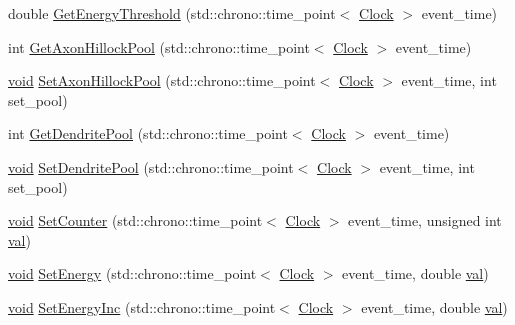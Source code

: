 \begin{DoxyCompactItemize}
\item 
double \mbox{\hyperlink{class_soma_a0b45cc454565027bb25daa1396056a7e}{Get\+Energy\+Threshold}} (std\+::chrono\+::time\+\_\+point$<$ \mbox{\hyperlink{universe_8h_a0ef8d951d1ca5ab3cfaf7ab4c7a6fd80}{Clock}} $>$ event\+\_\+time)
\item 
int \mbox{\hyperlink{class_soma_a23dc309849522d9f857fdcc71ea85877}{Get\+Axon\+Hillock\+Pool}} (std\+::chrono\+::time\+\_\+point$<$ \mbox{\hyperlink{universe_8h_a0ef8d951d1ca5ab3cfaf7ab4c7a6fd80}{Clock}} $>$ event\+\_\+time)
\item 
\mbox{\hyperlink{glad_8h_a950fc91edb4504f62f1c577bf4727c29}{void}} \mbox{\hyperlink{class_soma_a67cdb8d00b7130b44d4ac75468f4b385}{Set\+Axon\+Hillock\+Pool}} (std\+::chrono\+::time\+\_\+point$<$ \mbox{\hyperlink{universe_8h_a0ef8d951d1ca5ab3cfaf7ab4c7a6fd80}{Clock}} $>$ event\+\_\+time, int set\+\_\+pool)
\item 
int \mbox{\hyperlink{class_soma_a000d9eca00c61af853fd81a2c1569b0e}{Get\+Dendrite\+Pool}} (std\+::chrono\+::time\+\_\+point$<$ \mbox{\hyperlink{universe_8h_a0ef8d951d1ca5ab3cfaf7ab4c7a6fd80}{Clock}} $>$ event\+\_\+time)
\item 
\mbox{\hyperlink{glad_8h_a950fc91edb4504f62f1c577bf4727c29}{void}} \mbox{\hyperlink{class_soma_a08260f4dfa8f736611fb924cfd03c4ec}{Set\+Dendrite\+Pool}} (std\+::chrono\+::time\+\_\+point$<$ \mbox{\hyperlink{universe_8h_a0ef8d951d1ca5ab3cfaf7ab4c7a6fd80}{Clock}} $>$ event\+\_\+time, int set\+\_\+pool)
\item 
\mbox{\hyperlink{glad_8h_a950fc91edb4504f62f1c577bf4727c29}{void}} \mbox{\hyperlink{class_soma_a9ef49d3fea8c0fbe6513f3910339f736}{Set\+Counter}} (std\+::chrono\+::time\+\_\+point$<$ \mbox{\hyperlink{universe_8h_a0ef8d951d1ca5ab3cfaf7ab4c7a6fd80}{Clock}} $>$ event\+\_\+time, unsigned int \mbox{\hyperlink{glad_8h_a26942fd2ed566ef553eae82d2c109c8f}{val}})
\item 
\mbox{\hyperlink{glad_8h_a950fc91edb4504f62f1c577bf4727c29}{void}} \mbox{\hyperlink{class_soma_a0d1c0271fc8eeacd6e8836f751dff331}{Set\+Energy}} (std\+::chrono\+::time\+\_\+point$<$ \mbox{\hyperlink{universe_8h_a0ef8d951d1ca5ab3cfaf7ab4c7a6fd80}{Clock}} $>$ event\+\_\+time, double \mbox{\hyperlink{glad_8h_a26942fd2ed566ef553eae82d2c109c8f}{val}})
\item 
\mbox{\hyperlink{glad_8h_a950fc91edb4504f62f1c577bf4727c29}{void}} \mbox{\hyperlink{class_soma_a414afd7eb780e29a432603198a9838ed}{Set\+Energy\+Inc}} (std\+::chrono\+::time\+\_\+point$<$ \mbox{\hyperlink{universe_8h_a0ef8d951d1ca5ab3cfaf7ab4c7a6fd80}{Clock}} $>$ event\+\_\+time, double \mbox{\hyperlink{glad_8h_a26942fd2ed566ef553eae82d2c109c8f}{val}})

\end{DoxyCompactItemize}
